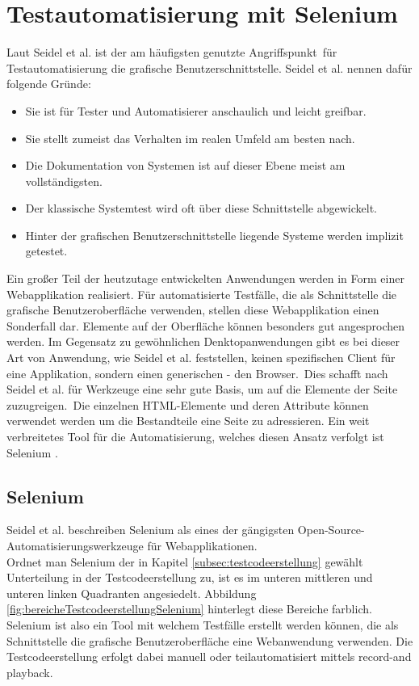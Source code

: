 \chapter{Testautomatisierung mit Selenium}
\label{sec:testautomatisierung_mit_selenium}

Laut Seidel et al. \cite[vgl. S. 48]{seidl_basiswissen_2012} ist der am häufigsten genutzte \frqq Angriffspunkt\flqq\ für Testautomatisierung die grafische Benutzerschnittstelle. Seidel et al. \cite[S. 48]{seidl_basiswissen_2012} nennen dafür folgende Gründe:
\begin{itemize}
\item \glqq Sie ist für Tester und Automatisierer anschaulich und leicht greifbar.\grqq
\item \glqq Sie stellt zumeist das Verhalten im realen Umfeld am besten nach.\grqq
\item \glqq Die Dokumentation von Systemen ist auf dieser Ebene meist am vollständigsten.\grqq
\item \glqq Der klassische Systemtest wird oft über diese Schnittstelle abgewickelt.\grqq
\item \glqq Hinter der grafischen Benutzerschnittstelle liegende Systeme werden implizit getestet.\grqq
\end{itemize}
Ein großer Teil der heutzutage entwickelten Anwendungen werden in Form einer Webapplikation realisiert. Für automatisierte Testfälle, die als Schnittstelle die grafische Benutzeroberfläche verwenden, stellen diese Webapplikation einen Sonderfall dar. Elemente auf der Oberfläche können besonders gut angesprochen werden.
Im Gegensatz zu gewöhnlichen Denktopanwendungen gibt es bei dieser Art von Anwendung, wie Seidel et al. \cite[vgl. S. 88]{seidl_basiswissen_2012} feststellen, \glqq keinen spezifischen Client für eine Applikation, sondern einen generischen - den Browser.\grqq\ Dies schafft nach Seidel et al.  \cite[vgl. S. 59]{seidl_basiswissen_2012} \glqq für Werkzeuge eine sehr gute Basis, um auf die Elemente der Seite zuzugreigen.\grqq\ Die einzelnen HTML-Elemente und deren Attribute können verwendet werden um die Bestandteile eine Seite zu adressieren.
Ein weit verbreitetes Tool für die Automatisierung, welches diesen Ansatz verfolgt ist Selenium \cite{selenium_selenium_2015}.
\section{Selenium}
\label{sec:selenium}
Seidel et al. \cite[S. 142]{seidl_basiswissen_2012} beschreiben Selenium als \glqq eines der gängigsten Open-Source-Automatisierungswerkzeuge für Webapplikationen.\grqq\\
Ordnet man Selenium der in Kapitel \ref{subsec:testcodeerstellung} gewählt Unterteilung in der Testcodeerstellung zu, ist es im unteren mittleren und unteren linken Quadranten angesiedelt. Abbildung \ref{fig:bereicheTestcodeerstellungSelenium} hinterlegt diese Bereiche farblich.
Selenium ist also ein Tool mit welchem Testfälle erstellt werden können, die als Schnittstelle die grafische Benutzeroberfläche eine Webanwendung verwenden. Die Testcodeerstellung erfolgt dabei manuell oder teilautomatisiert mittels \grq record-and playback\grq.\\

